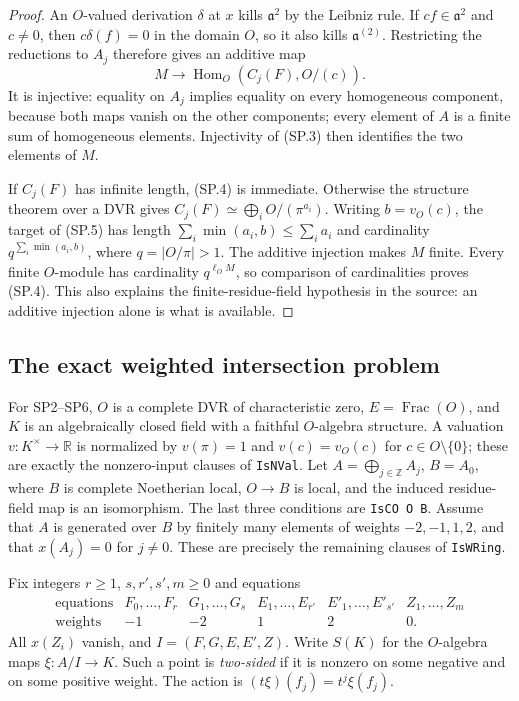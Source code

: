 \begin{proof}
An $O$-valued derivation $\delta$ at $x$ kills $\mathfrak a^2$ by the
Leibniz rule.  If $cf\in\mathfrak a^2$ and $c\ne0$, then
$c\delta(f)=0$ in the domain $O$, so it also kills
$\mathfrak a^{(2)}$.  Restricting the reductions to $A_j$ therefore
gives an additive map
\[
 M\longrightarrow\operatorname{Hom}_O(C_j(F),O/(c)).
 \tag{SP.5}
\]
It is injective: equality on $A_j$ implies equality on every homogeneous
component, because both maps vanish on the other components; every
element of $A$ is a finite sum of homogeneous elements.  Injectivity
of (SP.3) then identifies the two elements of $M$.

If $C_j(F)$ has infinite length, (SP.4) is immediate.  Otherwise the
structure theorem over a DVR gives
$C_j(F)\simeq\bigoplus_iO/(\pi^{a_i})$.  Writing $b=v_O(c)$, the
target of (SP.5) has length $\sum_i\min(a_i,b)\le\sum_i a_i$ and
cardinality $q^{\sum_i\min(a_i,b)}$, where $q=|O/\pi|>1$.
The additive injection makes $M$ finite.  Every finite $O$-module has
cardinality $q^{\ell_O M}$, so comparison of cardinalities proves
(SP.4).  This also explains the finite-residue-field hypothesis in the
source: an additive injection alone is what is available.
\end{proof}

\subsection{The exact weighted intersection problem}

For SP2--SP6, $O$ is a complete DVR of characteristic zero,
$E=\operatorname{Frac}(O)$, and $K$ is an algebraically closed field
with a faithful $O$-algebra structure.  A valuation
$v:K^\times\to\mathbb R$ is normalized by $v(\pi)=1$ and
$v(c)=v_O(c)$ for $c\in O\setminus\{0\}$; these are exactly the
nonzero-input clauses of \texttt{IsNVal}.  Let
$A=\bigoplus_{j\in\mathbb Z}A_j$, $B=A_0$, where $B$ is complete
Noetherian local, $O\to B$ is local, and the induced residue-field map
is an isomorphism.  The last three conditions are \texttt{IsCO O B}.
Assume that $A$ is generated over $B$ by finitely many elements of
weights $-2,-1,1,2$, and that $x(A_j)=0$ for $j\ne0$.
These are precisely the remaining clauses of \texttt{IsWRing}.

Fix integers $r\ge1$, $s,r',s',m\ge0$ and equations
\[
\begin{array}{c|ccccc}
 \text{equations}&F_0,\ldots,F_r&G_1,\ldots,G_s&E_1,\ldots,E_{r'}
       &E'_1,\ldots,E'_{s'}&Z_1,\ldots,Z_m\\
 \text{weights}&-1&-2&1&2&0 .
\end{array}
 \tag{SP.6}
\]
All $x(Z_i)$ vanish, and $I=(F,G,E,E',Z)$.  Write $S(K)$ for the
$O$-algebra maps $\xi:A/I\to K$.  Such a point is \emph{two-sided}
if it is nonzero on some negative and on some positive weight.
The action is $(t\xi)(f_j)=t^j\xi(f_j)$.

